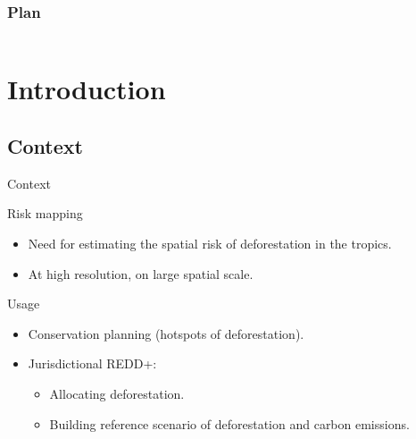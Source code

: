 \documentclass[10pt,table,dvipsnames,compress]{beamer}
\newif\ifplacelogo %
\begin{document}

\placelogotrue
\begin{frame}
  \frametitle{Plan}
  \begin{columns}[c]
    \begin{column}{0.5\textwidth}
      \tableofcontents[sections=1]
      \vspace{0.5cm}
      \tableofcontents[sections=2]
    \end{column}
    \begin{column}{0.5\textwidth}
        \tableofcontents[sections=3]
        \vspace{0.5cm}
        \tableofcontents[sections=4]
    \end{column}
  \end{columns}
\end{frame}
\placelogofalse

\section{Introduction}
\label{sec:org20ea72a}
\subsection{Context}
\label{sec:org252f1c3}
\begin{frame}[label={sec:orgd788218}]{Context}
\begin{block}{Risk mapping}
\begin{itemize}
\item Need for estimating the spatial risk of deforestation in the tropics.
\item At high resolution, on large spatial scale.
\end{itemize}
\end{block}

\begin{block}{Usage}
\begin{itemize}
\item Conservation planning (hotspots of deforestation).
\item Jurisdictional REDD+:
\begin{itemize}
\item Allocating deforestation.
\item Building reference scenario of deforestation and carbon emissions.
\end{itemize}
\end{itemize}
\end{block}
\end{frame}
\end{document}
